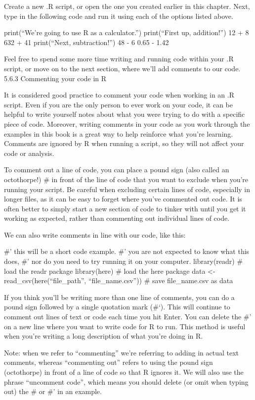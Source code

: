 \documentclass[
  letterpaper,
  DIV=11,
  numbers=noendperiod]{scrreprt}
\begin{document}
Create a new .R script, or open the one you created earlier in this
chapter. Next, type in the following code and run it using each of the
options listed above.

print(``We're going to use R as a calculator.'') print(``First up,
addition!'') 12 + 8 632 + 41 print(``Next, subtraction!'') 48 - 6 0.65 -
1.42

Feel free to spend some more time writing and running code within your
.R script, or move on to the next section, where we'll add comments to
our code. 5.6.3 Commenting your code in R

It is considered good practice to comment your code when working in an
.R script. Even if you are the only person to ever work on your code, it
can be helpful to write yourself notes about what you were trying to do
with a specific piece of code. Moreover, writing comments in your code
as you work through the examples in this book is a great way to help
reinforce what you're learning. Comments are ignored by R when running a
script, so they will not affect your code or analysis.

To comment out a line of code, you can place a pound sign (also called
an octothorpe!) \# in front of the line of code that you want to exclude
when you're running your script. Be careful when excluding certain lines
of code, especially in longer files, as it can be easy to forget where
you've commented out code. It is often better to simply start a new
section of code to tinker with until you get it working as expected,
rather than commenting out individual lines of code.

We can also write comments in line with our code, like this:

\#' this will be a short code example. \#' you are not expected to know
what this does, \#' nor do you need to try running it on your computer.
library(readr) \# load the readr package library(here) \# load the here
package data \textless- read\_csv(here(``file\_path'',
``file\_name.csv'')) \# save file\_name.csv as data

If you think you'll be writing more than one line of comments, you can
do a pound sign followed by a single quotation mark (\#`). This will
continue to comment out lines of text or code each time you hit Enter.
You can delete the \#' on a new line where you want to write code for R
to run. This method is useful when you're writing a long description of
what you're doing in R.

Note: when we refer to ``commenting'' we're referring to adding in
actual text comments, whereas ``commenting out'' refers to using the
pound sign (octothorpe) in front of a line of code so that R ignores it.
We will also use the phrase ``uncomment code'', which means you should
delete (or omit when typing out) the \# or \#' in an example.
\end{document}
